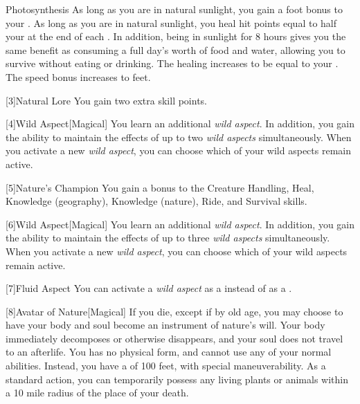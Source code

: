 {            \begin{freeability}{Photosynthesis}
                As long as you are in natural sunlight, you gain a  foot bonus to your .
                \rankline
                 As long as you are in natural sunlight, you heal hit points equal to half your  at the end of each .
                In addition, being in sunlight for 8 hours gives you the same benefit as consuming a full day's worth of food and water, allowing you to survive without eating or drinking.
                 The healing increases to be equal to your .
                 The speed bonus increases to  feet.
            \end{freeability}
        }

        [3]{Natural Lore}
        You gain two extra skill points.

        [4]{Wild Aspect}[Magical]
        You learn an additional \textit{wild aspect}.
        In addition, you gain the ability to maintain the effects of up to two \textit{wild aspects} simultaneously.
        When you activate a new \textit{wild aspect}, you can choose which of your wild aspects remain active. 

        [5]{Nature's Champion}
        You gain a  bonus to the Creature Handling, Heal, Knowledge (geography), Knowledge (nature), Ride, and Survival skills.

        [6]{Wild Aspect}[Magical]
        You learn an additional \textit{wild aspect}.
        In addition, you gain the ability to maintain the effects of up to three \textit{wild aspects} simultaneously.
        When you activate a new \textit{wild aspect}, you can choose which of your wild aspects remain active. 

        [7]{Fluid Aspect}
        You can activate a \textit{wild aspect} as a  instead of as a .

        [8]{Avatar of Nature}[Magical]
        If you die, except if by old age, you may choose to have your body and soul become an instrument of nature's will.
        Your body immediately decomposes or otherwise disappears, and your soul does not travel to an afterlife.
        You has no physical form, and cannot use any of your normal abilities.
        Instead, you have a  of 100 feet, with special maneuverability.
        As a standard action, you can temporarily possess any living plants or animals within a 10 mile radius of the place of your death.

